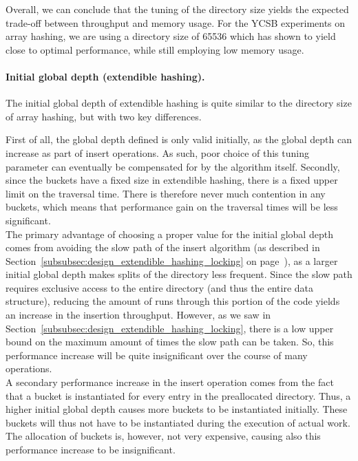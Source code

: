 \documentclass[11pt]{article} %
\begin{document}
Overall, we can conclude that the tuning of the directory size yields the expected trade-off between throughput and memory usage. For the YCSB experiments on array hashing, we are using a directory size of 65536 which has shown to yield close to optimal performance, while still employing low memory usage.
\paragraph{Initial global depth (extendible hashing).} The initial global depth of extendible hashing is quite similar to the directory size of array hashing, but with two key differences. 

First of all, the global depth defined is only valid initially, as the global depth can increase as part of insert operations. As such, poor choice of this tuning parameter can eventually be compensated for by the algorithm itself. Secondly, since the buckets have a fixed size in extendible hashing, there is a fixed upper limit on the traversal time. There is therefore never much contention in any buckets, which means that performance gain on the traversal times will be less significant.\\

The primary advantage of choosing a proper value for the initial global depth comes from avoiding the slow path of the insert algorithm (as described in Section~\ref{subsubsec:design_extendible_hashing_locking} on page~\pageref{subsubsec:design_extendible_hashing_locking}), as a larger initial global depth makes splits of the directory less frequent. Since the slow path requires exclusive access to the entire directory (and thus the entire data structure), reducing the amount of runs through this portion of the code yields an increase in the insertion throughput. However, as we saw in Section~\ref{subsubsec:design_extendible_hashing_locking}, there is a low upper bound on the maximum amount of times the slow path can be taken. So, this performance increase will be quite insignificant over the course of many operations.\\

A secondary performance increase in the insert operation comes from the fact that a bucket is instantiated for every entry in the preallocated directory. Thus, a higher initial global depth causes more buckets to be instantiated initially. These buckets will thus not have to be instantiated during the execution of actual work. The allocation of buckets is, however, not very expensive, causing also this performance increase to be insignificant. \\
\end{document}
